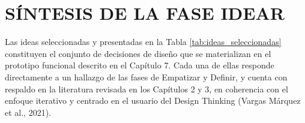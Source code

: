 \section{SÍNTESIS DE LA FASE IDEAR}
Las ideas seleccionadas y presentadas en la Tabla \ref{tab:ideas_seleccionadas} constituyen el conjunto de decisiones de diseño que se materializan en el prototipo funcional descrito en el Capítulo 7. Cada una de ellas responde directamente a un hallazgo de las fases de Empatizar y Definir, y cuenta con respaldo en la literatura revisada en los Capítulos 2 y 3, en coherencia con el enfoque iterativo y centrado en el usuario del Design Thinking (Vargas Márquez et al., 2021).